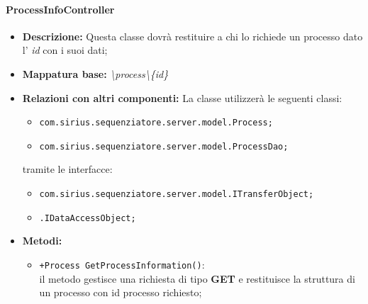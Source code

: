 \paragraph{ProcessInfoController}%
\begin{itemize}
	\item \textbf{Descrizione: } Questa classe dovrà restituire a chi lo richiede un processo dato l' \textit{id} con i suoi dati;
	\item \textbf{Mappatura base: }\textit{\textbackslash process\textbackslash \{id\}}
	\item \textbf{Relazioni con altri componenti: }
	La classe utilizzerà le seguenti classi:
	\begin{itemize}
		\item \texttt{com.sirius.sequenziatore.server.model.Process;}
		\item \texttt{com.sirius.sequenziatore.server.model.ProcessDao;}
	\end{itemize}
	tramite le interfacce:
	\begin{itemize}
		\item \texttt{com.sirius.sequenziatore.server.model.ITransferObject;}
		\item \texttt{\sModel .IDataAccessObject;}
	\end{itemize}
	\item \textbf{Metodi: }\begin{itemize}
					\item \texttt{+Process GetProcessInformation()}:\\
					il metodo gestisce una richiesta di tipo \textbf{GET} e restituisce la struttura di un processo con id processo richiesto;
				\end{itemize}
\end{itemize}